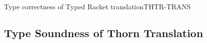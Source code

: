 \documentclass[acmlarge, anonymous, authordraft, review]{acmart} %
\begin{document}
\begin{lemma}{Type correctness of Typed Racket translation}{THTR-TRANS}
% 
% 
\end{lemma}

\subsection*{Type Soundness of Thorn Translation}
\end{document}

